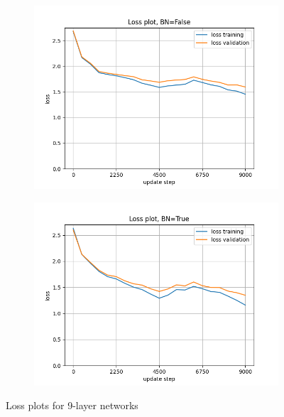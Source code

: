 \documentclass[12pt, a4paper]{article}
\begin{document}
\begin{figure}[H]
    \centering
    \begin{subfigure}{0.45\textwidth}
        \centering
        \includegraphics[width=\textwidth]{results/2-2250-9-loss-False.png}
    \end{subfigure}
    \hfill
    \begin{subfigure}{0.45\textwidth}
        \centering
        \includegraphics[width=\textwidth]{results/2-2250-9-loss-True.png}
    \end{subfigure}
    \caption{Loss plots for 9-layer networks}
    \label{fig:9-layer}
\end{figure}
\end{document}
